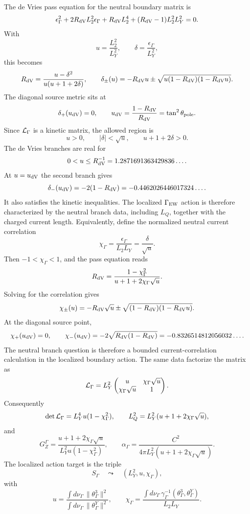 \documentclass[11pt]{article}
\theoremstyle{definition}
\theoremstyle{remark}
\begin{document}
The de Vries pass equation for the neutral boundary matrix is
\[
  \epsilon_\Gamma^2
  +2R_{\rm dV}L_2^2\epsilon_\Gamma
  +R_{\rm dV}L_2^4
  +(R_{\rm dV}-1)L_2^2L_Y^2
  =
  0.
\]
With
\[
  u=\frac{L_2^2}{L_Y^2},
  \qquad
  \delta=\frac{\epsilon_\Gamma}{L_Y^2},
\]
this becomes
\[
  R_{\rm dV}
  =
  \frac{u-\delta^2}{u(u+1+2\delta)},
  \qquad
  \delta_\pm(u)
  =
  -R_{\rm dV}u
  \pm
  \sqrt{u(1-R_{\rm dV})(1-R_{\rm dV}u)}.
\]
The diagonal source metric sits at
\[
  \delta_+(u_{\rm dV})=0,
  \qquad
  u_{\rm dV}=\frac{1-R_{\rm dV}}{R_{\rm dV}}
  =
  \tan^2\theta_{\rm pole}.
\]
Since \({\cal L}_\Gamma\) is a kinetic matrix, the allowed region is
\[
  u>0,\qquad
  |\delta|<\sqrt u,\qquad
  u+1+2\delta>0.
\]
The de Vries branches are real for
\[
  0<u\le R_{\rm dV}^{-1}=1.2871691363429836\ldots .
\]
At \(u=u_{\rm dV}\) the second branch gives
\[
  \delta_-(u_{\rm dV})
  =
  -2(1-R_{\rm dV})
  =
  -0.4462026446017324\ldots .
\]
It also satisfies the kinetic inequalities.  The localized
\(\Gamma_{\rm EW}\) action is therefore characterized by the neutral branch
data, including \(L_Q\), together with the charged current length.
Equivalently, define the normalized neutral current correlation
\[
  \chi_\Gamma
  =
  \frac{\epsilon_\Gamma}{L_2L_Y}
  =
  \frac{\delta}{\sqrt u}.
\]
Then \(-1<\chi_\Gamma<1\), and the pass equation reads
\[
  R_{\rm dV}
  =
  \frac{1-\chi_\Gamma^2}
       {u+1+2\chi_\Gamma\sqrt u}.
\]
Solving for the correlation gives
\[
  \chi_\pm(u)
  =
  -R_{\rm dV}\sqrt u
  \pm
  \sqrt{(1-R_{\rm dV})(1-R_{\rm dV}u)}.
\]
At the diagonal source point,
\[
  \chi_+(u_{\rm dV})=0,
  \qquad
  \chi_-(u_{\rm dV})
  =
  -2\sqrt{R_{\rm dV}(1-R_{\rm dV})}
  =
  -0.8326514812056032\ldots .
\]
The neutral branch question is therefore a bounded current-correlation
calculation in the localized boundary action.
The same data factorize the matrix as
\[
  {\cal L}_\Gamma
  =
  L_Y^2
  \begin{pmatrix}
    u&\chi_\Gamma\sqrt u\\
    \chi_\Gamma\sqrt u&1
  \end{pmatrix}.
\]
Consequently
\[
  \det{\cal L}_\Gamma=L_Y^4u(1-\chi_\Gamma^2),
  \qquad
  L_Q^2=L_Y^2(u+1+2\chi_\Gamma\sqrt u),
\]
and
\[
  G_Z^\Gamma
  =
  \frac{u+1+2\chi_\Gamma\sqrt u}
       {L_Y^2u(1-\chi_\Gamma^2)},
  \qquad
  \alpha_\Gamma
  =
  \frac{C^2}
       {4\pi L_Y^2(u+1+2\chi_\Gamma\sqrt u)}.
\]
The localized action target is the triple
\[
  S_\Gamma
  \quad\leadsto\quad
  \left(L_Y^2,u,\chi_\Gamma\right),
\]
with
\[
  u=
  \frac{\int d\nu_\Gamma\,\|\theta_\Gamma^3\|^2}
       {\int d\nu_\Gamma\,\|\theta_\Gamma^Y\|^2},
  \qquad
  \chi_\Gamma=
  \frac{\int d\nu_\Gamma\,
  \gamma_\Gamma^{-1}(\theta_\Gamma^3,\theta_\Gamma^Y)}
  {L_2L_Y}.
\]
\end{document}
